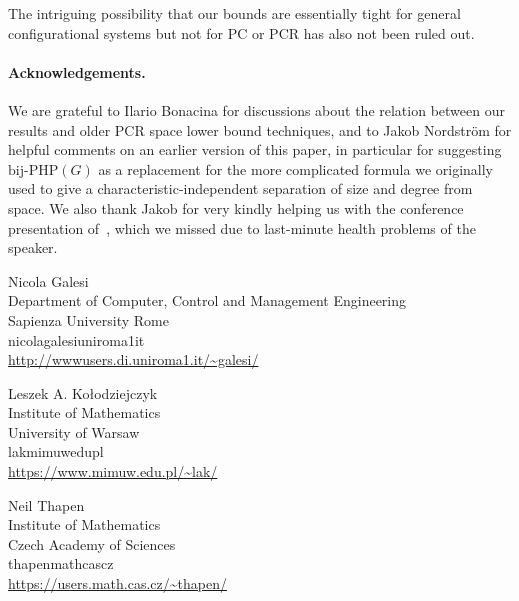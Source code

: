\documentclass{toc}
\begin{document}
The intriguing possibility that our bounds are essentially tight for
general configurational systems but not for PC or PCR
has also not been ruled out.



\paragraph{Acknowledgements.} 
We are grateful to Ilario Bonacina for discussions about the relation between 
our results and older PCR space lower bound techniques, and to Jakob Nordstr\"{o}m for
helpful comments on an earlier version of this paper, in particular for suggesting
$\mathrm{bij}$-$\mathrm{PHP}(G)$ as a replacement for the more complicated formula 
we originally used to give a characteristic-independent
separation of size and degree from space.  We also thank Jakob for 
very kindly helping us
with the conference presentation of~\cite{conf-version},
which we missed due to last-minute health problems of the speaker.








%
%
%


%
%
%
%
%
\begin{tocauthors}
\begin{tocinfo}[galesi]
 Nicola Galesi\\
 Department of Computer, Control and Management Engineering\\
 Sapienza University  Rome\\
 nicola\tocdot{}galesi\tocat{}uniroma1\tocdot{}it\\
%
 \url{http://wwwusers.di.uniroma1.it/~galesi/}      %
\end{tocinfo}
\begin{tocinfo}[kolodziejczyk]
  Leszek A. Ko\l{}odziejczyk\\
  Institute of Mathematics\\
  University of Warsaw\\
lak\tocat{}mimuw\tocdot{}edu\tocdot{}pl \\
  \url{https://www.mimuw.edu.pl/~lak/}
\end{tocinfo}
\begin{tocinfo}[thapen]
  Neil Thapen\\
  Institute of Mathematics\\
  Czech Academy of Sciences\\
 thapen\tocat{}math\tocdot{}cas\tocdot{}cz \\
  \url{https://users.math.cas.cz/~thapen/}
\end{tocinfo}
\end{tocauthors}
\end{document}
